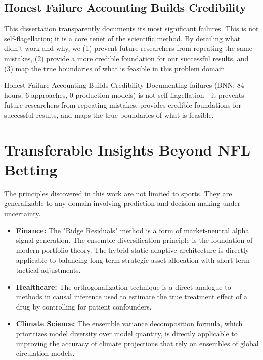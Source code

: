 \subsection{Honest Failure Accounting Builds Credibility}
This dissertation transparently documents its most significant failures. This is not self-flagellation; it is a core tenet of the scientific method. By detailing what didn't work and why, we (1) prevent future researchers from repeating the same mistakes, (2) provide a more credible foundation for our successful results, and (3) map the true boundaries of what is feasible in this problem domain.

\begin{keyfinding}{Honest Failure Accounting Builds Credibility}
Documenting failures (BNN: 84 hours, 6 approaches, 0 production models) is not self-flagellation---it prevents future researchers from repeating mistakes, provides credible foundations for successful results, and maps the true boundaries of what is feasible.
\end{keyfinding}

\section{Transferable Insights Beyond NFL Betting}
\label{sec:transferable-condensed}

The principles discovered in this work are not limited to sports. They are generalizable to any domain involving prediction and decision-making under uncertainty.

\begin{itemize}
    \item \textbf{Finance:} The "Ridge Residuals" method is a form of market-neutral alpha signal generation. The ensemble diversification principle is the foundation of modern portfolio theory. The hybrid static-adaptive architecture is directly applicable to balancing long-term strategic asset allocation with short-term tactical adjustments.

    \item \textbf{Healthcare:} The orthogonalization technique is a direct analogue to methods in causal inference used to estimate the true treatment effect of a drug by controlling for patient confounders.

    \item \textbf{Climate Science:} The ensemble variance decomposition formula, which prioritizes model diversity over model quantity, is directly applicable to improving the accuracy of climate projections that rely on ensembles of global circulation models.
\end{itemize}

